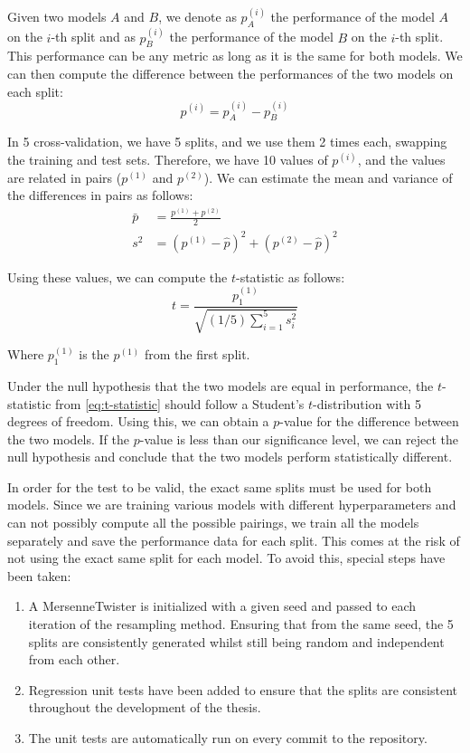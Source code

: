 Given two models $A$ and $B$, we denote as $p_A^{(i)}$ the performance of the
model $A$ on the $i$-th split and as $p_B^{(i)}$ the performance of the model
$B$ on the $i$-th split. This performance can be any metric as long as it is
the same for both models.
We can then compute the difference between the
performances of the two models on each split:
\begin{equation}
    p^{(i)} = p_A^{(i)} - p_B^{(i)}
\end{equation}

In 5 cross-validation, we have 5 splits, and we use them 2 times each,
swapping the training and test sets. Therefore, we have 10 values of $p^{(i)}$,
and the values are related in pairs ($p^{(1)}$ and $p^{(2)}$). We can estimate
the mean and variance of the differences in pairs as follows:
\begin{align}
    \bar{p} & = \frac{p^{(1)} + p^{(2)}}{2}                                         \\
    s^2     & = \left(p^{(1)} - \hat{p}\right)^2 + \left(p^{(2)} - \hat{p}\right)^2
\end{align}

Using these values, we can compute the $t$-statistic as follows:
\begin{equation}\label{eq:t-statistic}
    t = \frac{p_1^{(1)}}{\sqrt{(1/5)\sum_{i=1}^5 s_i^2}}
\end{equation}

Where $p_1^{(1)}$ is the $p^{(1)}$ from the first split.

Under the null hypothesis that the two models are equal in performance, the
$t$-statistic from \cref{eq:t-statistic} should follow a Student's
$t$-distribution with 5 degrees of freedom. Using this, we can obtain a
$p$-value for the difference between the two models. If the $p$-value is less
than our significance level, we can reject the null hypothesis and conclude
that the two models perform statistically different.

In order for the test to be valid, the exact same splits must be used for both
models. Since we are training various models with different hyperparameters
and can not possibly compute all the possible pairings, we train all the models
separately and save the performance data for each split.
This comes at the risk of not using the exact same split for each model. To avoid
this, special steps have been taken:

\begin{enumerate}
    \item A MersenneTwister is initialized with a given seed and passed to each
          iteration of the resampling method. Ensuring that from the same seed,
          the 5 splits are consistently generated whilst still being random and
          independent from each other.
    \item Regression unit tests have been added to ensure that the splits are
          consistent throughout the development of the thesis.
    \item The unit tests are automatically run on every commit to the repository.
\end{enumerate}

